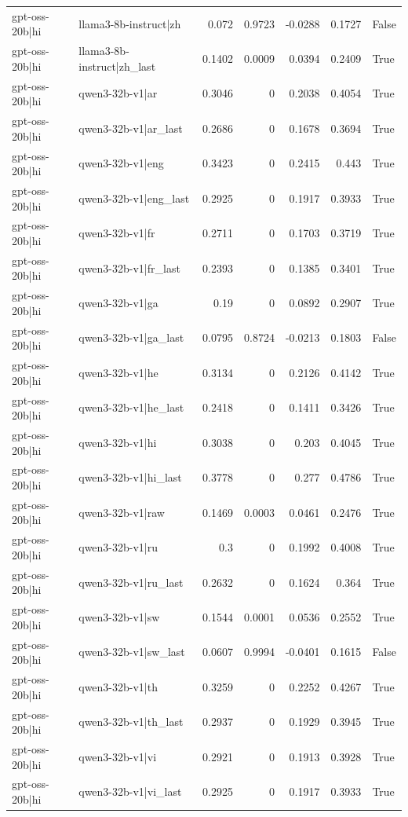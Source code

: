 \begin{table}
\begin{tabular}{l l r r r r l}
gpt-oss-20b|hi & llama3-8b-instruct|zh & 0.072 & 0.9723 & -0.0288 & 0.1727 & False \\
gpt-oss-20b|hi & llama3-8b-instruct|zh_last & 0.1402 & 0.0009 & 0.0394 & 0.2409 & True \\
gpt-oss-20b|hi & qwen3-32b-v1|ar & 0.3046 & 0 & 0.2038 & 0.4054 & True \\
gpt-oss-20b|hi & qwen3-32b-v1|ar_last & 0.2686 & 0 & 0.1678 & 0.3694 & True \\
gpt-oss-20b|hi & qwen3-32b-v1|eng & 0.3423 & 0 & 0.2415 & 0.443 & True \\
gpt-oss-20b|hi & qwen3-32b-v1|eng_last & 0.2925 & 0 & 0.1917 & 0.3933 & True \\
gpt-oss-20b|hi & qwen3-32b-v1|fr & 0.2711 & 0 & 0.1703 & 0.3719 & True \\
gpt-oss-20b|hi & qwen3-32b-v1|fr_last & 0.2393 & 0 & 0.1385 & 0.3401 & True \\
gpt-oss-20b|hi & qwen3-32b-v1|ga & 0.19 & 0 & 0.0892 & 0.2907 & True \\
gpt-oss-20b|hi & qwen3-32b-v1|ga_last & 0.0795 & 0.8724 & -0.0213 & 0.1803 & False \\
gpt-oss-20b|hi & qwen3-32b-v1|he & 0.3134 & 0 & 0.2126 & 0.4142 & True \\
gpt-oss-20b|hi & qwen3-32b-v1|he_last & 0.2418 & 0 & 0.1411 & 0.3426 & True \\
gpt-oss-20b|hi & qwen3-32b-v1|hi & 0.3038 & 0 & 0.203 & 0.4045 & True \\
gpt-oss-20b|hi & qwen3-32b-v1|hi_last & 0.3778 & 0 & 0.277 & 0.4786 & True \\
gpt-oss-20b|hi & qwen3-32b-v1|raw & 0.1469 & 0.0003 & 0.0461 & 0.2476 & True \\
gpt-oss-20b|hi & qwen3-32b-v1|ru & 0.3 & 0 & 0.1992 & 0.4008 & True \\
gpt-oss-20b|hi & qwen3-32b-v1|ru_last & 0.2632 & 0 & 0.1624 & 0.364 & True \\
gpt-oss-20b|hi & qwen3-32b-v1|sw & 0.1544 & 0.0001 & 0.0536 & 0.2552 & True \\
gpt-oss-20b|hi & qwen3-32b-v1|sw_last & 0.0607 & 0.9994 & -0.0401 & 0.1615 & False \\
gpt-oss-20b|hi & qwen3-32b-v1|th & 0.3259 & 0 & 0.2252 & 0.4267 & True \\
gpt-oss-20b|hi & qwen3-32b-v1|th_last & 0.2937 & 0 & 0.1929 & 0.3945 & True \\
gpt-oss-20b|hi & qwen3-32b-v1|vi & 0.2921 & 0 & 0.1913 & 0.3928 & True \\
gpt-oss-20b|hi & qwen3-32b-v1|vi_last & 0.2925 & 0 & 0.1917 & 0.3933 & True \\

\end{tabular}
\end{table}

